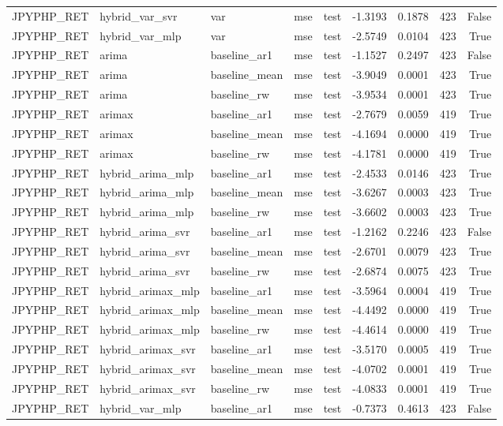 \begin{tabular}{lllllrrrr}
JPYPHP_RET & hybrid_var_svr & var & mse & test & -1.3193 & 0.1878 & 423 & False \\
JPYPHP_RET & hybrid_var_mlp & var & mse & test & -2.5749 & 0.0104 & 423 & True \\
JPYPHP_RET & arima & baseline_ar1 & mse & test & -1.1527 & 0.2497 & 423 & False \\
JPYPHP_RET & arima & baseline_mean & mse & test & -3.9049 & 0.0001 & 423 & True \\
JPYPHP_RET & arima & baseline_rw & mse & test & -3.9534 & 0.0001 & 423 & True \\
JPYPHP_RET & arimax & baseline_ar1 & mse & test & -2.7679 & 0.0059 & 419 & True \\
JPYPHP_RET & arimax & baseline_mean & mse & test & -4.1694 & 0.0000 & 419 & True \\
JPYPHP_RET & arimax & baseline_rw & mse & test & -4.1781 & 0.0000 & 419 & True \\
JPYPHP_RET & hybrid_arima_mlp & baseline_ar1 & mse & test & -2.4533 & 0.0146 & 423 & True \\
JPYPHP_RET & hybrid_arima_mlp & baseline_mean & mse & test & -3.6267 & 0.0003 & 423 & True \\
JPYPHP_RET & hybrid_arima_mlp & baseline_rw & mse & test & -3.6602 & 0.0003 & 423 & True \\
JPYPHP_RET & hybrid_arima_svr & baseline_ar1 & mse & test & -1.2162 & 0.2246 & 423 & False \\
JPYPHP_RET & hybrid_arima_svr & baseline_mean & mse & test & -2.6701 & 0.0079 & 423 & True \\
JPYPHP_RET & hybrid_arima_svr & baseline_rw & mse & test & -2.6874 & 0.0075 & 423 & True \\
JPYPHP_RET & hybrid_arimax_mlp & baseline_ar1 & mse & test & -3.5964 & 0.0004 & 419 & True \\
JPYPHP_RET & hybrid_arimax_mlp & baseline_mean & mse & test & -4.4492 & 0.0000 & 419 & True \\
JPYPHP_RET & hybrid_arimax_mlp & baseline_rw & mse & test & -4.4614 & 0.0000 & 419 & True \\
JPYPHP_RET & hybrid_arimax_svr & baseline_ar1 & mse & test & -3.5170 & 0.0005 & 419 & True \\
JPYPHP_RET & hybrid_arimax_svr & baseline_mean & mse & test & -4.0702 & 0.0001 & 419 & True \\
JPYPHP_RET & hybrid_arimax_svr & baseline_rw & mse & test & -4.0833 & 0.0001 & 419 & True \\
JPYPHP_RET & hybrid_var_mlp & baseline_ar1 & mse & test & -0.7373 & 0.4613 & 423 & False \\

\end{tabular}
